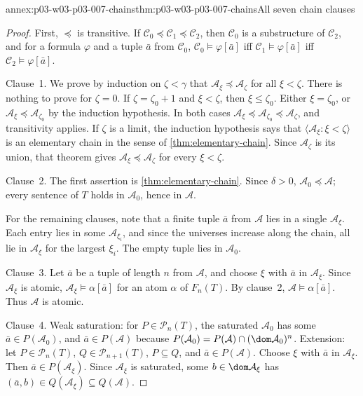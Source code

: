 \begin{annexitem}{annex:p03-w03-p03-007-chains}{thm:p03-w03-p03-007-chains}{All seven chain clauses}
\begin{proof}
First, \(\preccurlyeq\) is transitive. If
\(\mathcal C_0\preccurlyeq\mathcal C_1\preccurlyeq\mathcal C_2\), then
\(\mathcal C_0\) is a substructure of \(\mathcal C_2\), and for a formula
\(\varphi\) and a tuple \(\bar a\) from \(\mathcal C_0\),
\(\mathcal C_0\models\varphi[\bar a]\) iff
\(\mathcal C_1\models\varphi[\bar a]\) iff
\(\mathcal C_2\models\varphi[\bar a]\).

Clause~1. We prove by induction on \(\zeta<\gamma\) that
\(\mathcal A_\xi\preccurlyeq\mathcal A_\zeta\) for all \(\xi<\zeta\).
There is nothing to prove for \(\zeta=0\). If \(\zeta=\zeta_0+1\) and
\(\xi<\zeta\), then \(\xi\le\zeta_0\). Either \(\xi=\zeta_0\), or
\(\mathcal A_\xi\preccurlyeq\mathcal A_{\zeta_0}\) by the induction
hypothesis. In both cases
\(\mathcal A_\xi\preccurlyeq\mathcal A_{\zeta_0}\preccurlyeq\mathcal A_\zeta\),
and transitivity applies. If \(\zeta\) is a limit, the induction hypothesis
says that \(\langle\mathcal A_\xi:\xi<\zeta\rangle\) is an elementary chain
in the sense of \cref{thm:elementary-chain}. Since
\(\mathcal A_\zeta\) is its union, that theorem gives
\(\mathcal A_\xi\preccurlyeq\mathcal A_\zeta\) for every \(\xi<\zeta\).

Clause~2. The first assertion is \cref{thm:elementary-chain}. Since
\(\delta>0\), \(\mathcal A_0\preccurlyeq\mathcal A\); every sentence of \(T\)
holds in \(\mathcal A_0\), hence in \(\mathcal A\).

For the remaining clauses, note that a finite tuple \(\bar a\) from
\(\mathcal A\) lies in a single \(\mathcal A_\xi\). Each entry lies in some
\(\mathcal A_{\xi_i}\), and since the universes increase along the chain,
all lie in \(\mathcal A_\xi\) for the largest \(\xi_i\). The empty tuple lies
in \(\mathcal A_0\).

Clause~3. Let \(\bar a\) be a tuple of length \(n\) from \(\mathcal A\), and
choose \(\xi\) with \(\bar a\) in \(\mathcal A_\xi\). Since
\(\mathcal A_\xi\) is atomic, \(\mathcal A_\xi\models\alpha[\bar a]\) for an
atom \(\alpha\) of \(F_n(T)\). By clause~2,
\(\mathcal A\models\alpha[\bar a]\). Thus \(\mathcal A\) is atomic.

Clause~4. Weak saturation: for \(P\in\mathcal P_n(T)\), the saturated
\(\mathcal A_0\) has some \(\bar a\in P(\mathcal A_0)\), and
\(\bar a\in P(\mathcal A)\) because
\(P(\mathcal A_0)=P(\mathcal A)\cap(\dom\mathcal A_0)^n\). Extension: let
\(P\in\mathcal P_n(T)\), \(Q\in\mathcal P_{n+1}(T)\), \(P\subseteq Q\), and
\(\bar a\in P(\mathcal A)\). Choose \(\xi\) with \(\bar a\) in
\(\mathcal A_\xi\). Then \(\bar a\in P(\mathcal A_\xi)\). Since
\(\mathcal A_\xi\) is saturated, some \(b\in\dom\mathcal A_\xi\) has
\((\bar a,b)\in Q(\mathcal A_\xi)\subseteq Q(\mathcal A)\).


\end{proof}
\end{annexitem}
